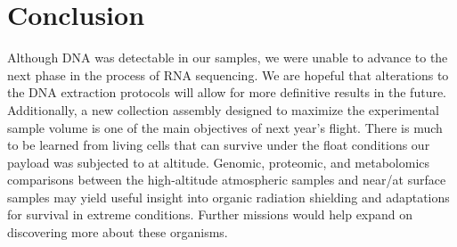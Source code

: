 \section{Conclusion}
\label{sec:Conclusion}
%
%
Although DNA was detectable in our samples, we were unable to advance to the next phase in the process of RNA sequencing. We are hopeful that alterations to the DNA extraction protocols will allow for more definitive results in the future. Additionally, a new collection assembly designed to maximize the experimental sample volume is one of the main objectives of next year’s flight. There is much to be learned from living cells that can survive under the float conditions our payload was subjected to at altitude. Genomic, proteomic, and metabolomics comparisons between the high-altitude atmospheric samples and near/at surface samples may yield useful insight into organic radiation shielding and adaptations for survival in extreme conditions. Further missions would help expand on discovering more about these organisms. 

